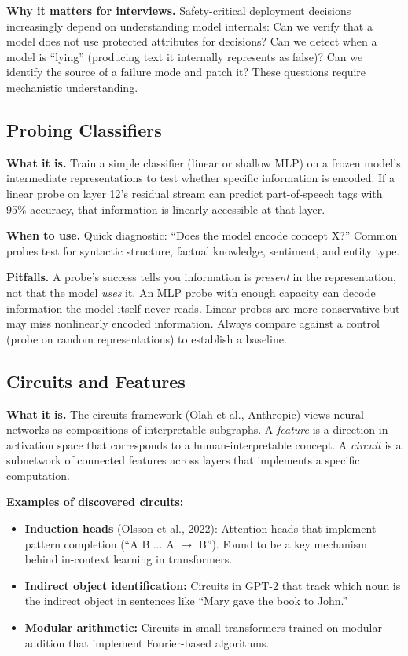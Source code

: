 \textbf{Why it matters for interviews.} Safety-critical deployment decisions increasingly depend on understanding model internals: Can we verify that a model does not use protected attributes for decisions? Can we detect when a model is ``lying'' (producing text it internally represents as false)? Can we identify the source of a failure mode and patch it? These questions require mechanistic understanding.

\subsection{Probing Classifiers}

\textbf{What it is.} Train a simple classifier (linear or shallow MLP) on a frozen model's intermediate representations to test whether specific information is encoded. If a linear probe on layer 12's residual stream can predict part-of-speech tags with 95\% accuracy, that information is linearly accessible at that layer.

\textbf{When to use.} Quick diagnostic: ``Does the model encode concept X?'' Common probes test for syntactic structure, factual knowledge, sentiment, and entity type.

\textbf{Pitfalls.} A probe's success tells you information is \textit{present} in the representation, not that the model \textit{uses} it. An MLP probe with enough capacity can decode information the model itself never reads. Linear probes are more conservative but may miss nonlinearly encoded information. Always compare against a control (probe on random representations) to establish a baseline.

\subsection{Circuits and Features}

\textbf{What it is.} The circuits framework (Olah et al., Anthropic) views neural networks as compositions of interpretable subgraphs. A \textit{feature} is a direction in activation space that corresponds to a human-interpretable concept. A \textit{circuit} is a subnetwork of connected features across layers that implements a specific computation.

\textbf{Examples of discovered circuits:}
\begin{itemize}
    \item \textbf{Induction heads} (Olsson et al., 2022): Attention heads that implement pattern completion (``A B ... A $\rightarrow$ B''). Found to be a key mechanism behind in-context learning in transformers.
    \item \textbf{Indirect object identification:} Circuits in GPT-2 that track which noun is the indirect object in sentences like ``Mary gave the book to John.''
    \item \textbf{Modular arithmetic:} Circuits in small transformers trained on modular addition that implement Fourier-based algorithms.
\end{itemize}

